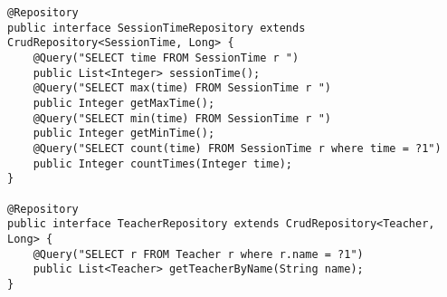 \begin{lstlisting}
@Repository
public interface SessionTimeRepository extends CrudRepository<SessionTime, Long> {
	@Query("SELECT time FROM SessionTime r ")
	public List<Integer> sessionTime();
	@Query("SELECT max(time) FROM SessionTime r ")
	public Integer getMaxTime();
	@Query("SELECT min(time) FROM SessionTime r ")
	public Integer getMinTime();
	@Query("SELECT count(time) FROM SessionTime r where time = ?1")
	public Integer countTimes(Integer time);
}

@Repository
public interface TeacherRepository extends CrudRepository<Teacher, Long> {
	@Query("SELECT r FROM Teacher r where r.name = ?1")
	public List<Teacher> getTeacherByName(String name);
}
	
\end{lstlisting}